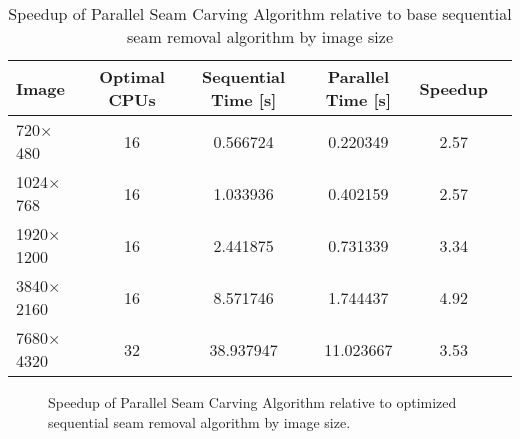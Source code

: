 \documentclass{article}
\begin{document}
\begin{table}[H]
\centering
\scriptsize
\begin{tabular}{lccccc}
    \toprule
    Image      & Optimal CPUs & Sequential Time [s] & Parallel Time [s] & Speedup \\
    \midrule
    720$\times$480    & 16 & 0.566724 & 0.220349 & 2.57 \\
    1024$\times$768   & 16 & 1.033936 & 0.402159 & 2.57 \\
    1920$\times$1200  & 16 & 2.441875 & 0.731339 & 3.34 \\
    3840$\times$2160  & 16 & 8.571746 & 1.744437 & 4.92 \\
    7680$\times$4320  & 32 & 38.937947 & 11.023667 & 3.53 \\
    \bottomrule
\end{tabular}
\caption{Speedup of Parallel Seam Carving Algorithm relative to base sequential seam removal algorithm by image size}
\label{tab:speedup-optimized}
\end{table}

\begin{figure}[H]
    \centering
    \caption{Speedup of Parallel Seam Carving Algorithm relative to optimized sequential seam removal algorithm by image size.}
    \label{fig:speedup_seam_carving}
\end{figure}
\end{document}
